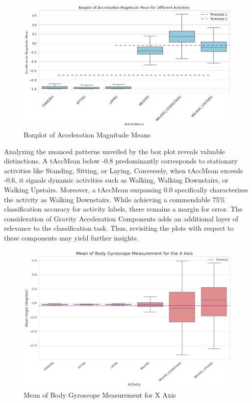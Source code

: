 \documentclass[conference]{IEEEtran}
\begin{document}
\begin{figure}[h!]
	\includegraphics[width= 1.0 \linewidth]{boxplot_acc_magnitude_mean.png}
	\centering
	\caption{Boxplot of Acceleration Magnitude Means}
	\label{boxplot_acc_magnitude_mean.png}
\end{figure}

Analyzing the nuanced patterns unveiled by the box plot reveals valuable distinctions. A tAccMean below -0.8 predominantly corresponds to stationary activities like Standing, Sitting, or Laying. Conversely, when tAccMean exceeds -0.6, it signals dynamic activities such as Walking, Walking Downstairs, or Walking Upstairs. Moreover, a tAccMean surpassing 0.0 specifically characterizes the activity as Walking Downstairs. While achieving a commendable 75\% classification accuracy for activity labels, there remains a margin for error. The consideration of Gravity Acceleration Components adds an additional layer of relevance to the classification task. Thus, revisiting the plots with respect to these components may yield further insights.

\begin{figure}[h!]
	\includegraphics[width= 1.0 \linewidth]{mean_body_gyroscope_x.png}
	\centering
	\caption{Mean of Body Gyroscope Measurement for X Axis}
	\label{mean_body_gyroscope_x.png}
\end{figure}
\end{document}
